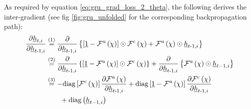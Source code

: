 As required by equation \ref{eq:gru_grad_loss_2_theta}, 
the following derives the inter-gradient
(see fig \ref{fig:gru_unfolded} for the corresponding backpropagation path):
\begin{align} \label{eq:gru_grad_inter}
    \frac{\partial \underline h_{t, i}}{\partial \underline h_{t\text{-}1, i}}
    &\overset{\textcolor{black}{(1)}}{=}
    \frac{\partial}{\partial \underline h_{t\text{-}1, i}} \left\{
        \left[
            \underline 1 
            -
            \mathcal{F}^\text{u}\left(\chi\right)
        \right]
        \odot
        \mathcal{F}^\text{c} \left(\chi\right)
        +
        \mathcal{F}^\text{u}\left(\chi\right)
        \odot
        \underline h_{t\text -1,i}
    \right\}
    \nonumber \\ &\overset{\textcolor{black}{(2)}}{=}
    \frac{\partial}{\partial \underline h_{t\text{-}1, i}} \left\{
        \left[
            \underline 1 
            -
            \mathcal{F}^\text{u}\left(\chi\right)
        \right]
        \odot
        \mathcal{F}^\text{c} \left(\chi\right)
    \right\}
    +
    \frac{\partial}{\partial \underline h_{t\text{-}1, i}} \left\{
        \mathcal{F}^\text{u}\left(\chi\right)
        \odot
        \underline h_{t-1,i}
    \right\}
    \nonumber \\ & \overset{\textcolor{black}{(3)}}{=}
    - \mathrm{diag}\left[\mathcal{F}^\text{c} \left(\chi\right)\right] 
    \frac{\partial \mathcal{F}^\text{u}\left(\chi\right)}
        {\partial \underline h_{t\text{-}1, i}}
    +
    \mathrm{diag} \left[
        \underline 1 
        -
        \mathcal{F}^\text{u}\left(\chi\right)
    \right]
    \frac{\partial \mathcal{F}^\text{c} \left(\chi\right)}
        {\partial \underline h_{t\text{-}1, i}}
    \nonumber \\ &\qquad +
    \mathrm{diag} \left(\underline h_{t-1,i}\right)

\end{align}
